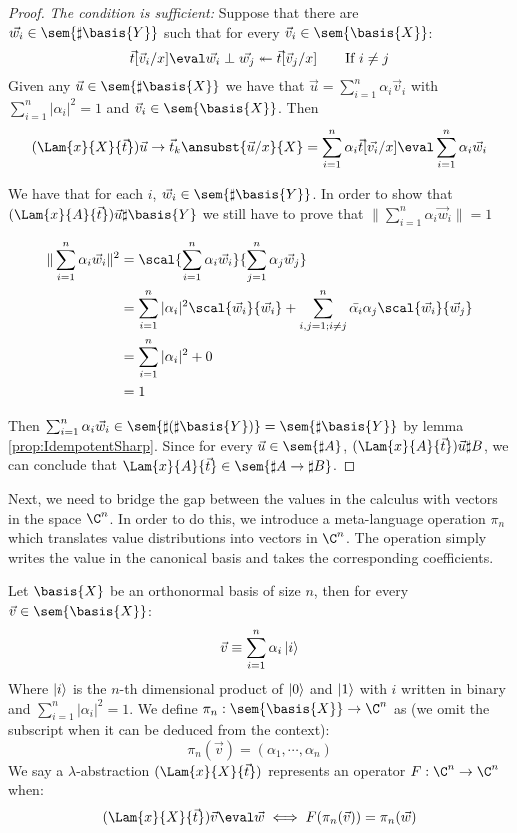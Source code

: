 \begin{proof}
  \textit{The condition is sufficient:} Suppose that there are $\vec{w_i}\in\sem{\sharp\basis{Y}}$ such that for every $\vec v_i\in\sem{\basis{X}}$:
  \[
    \vec t[\vec v_i/x] \eval \vec{w_i} \perp \vec{w_j} \twoheadleftarrow \vec t[\vec v_j/x]\qquad \text{If } i\neq j
  \]
  Given any $\vec u\in\sem{\sharp\basis{X}}$ we have that $\vec u = \sum_{i=1}^n \alpha_i \vec v_i$ with $\sum_{i=1}^n |\alpha_i|^2 = 1$ and $\vec v_i\in\sem{\basis{X}}$. Then 
  \[
    (\Lam{x}{X}{\vec t}) \vec u \to \vec t_k\ansubst{\vec u/x}{X}=\sum_{i=1}^{n}\alpha_i \vec{t}[\vec{v_i}/x]\eval\sum_{i=1}^n \alpha_i\vec w_i
  \]

  We have that for each $i$, $\vec w_i\in\sem{\sharp\basis{Y}}$. In order to show that $(\Lam{x}{A}{\vec t})\vec u\real\sharp\basis{Y}$ we still have to prove that $\|\sum_{i=1}^n \alpha_i \vec w_i\| = 1$

  \begin{align*}
    \|\sum_{i=1}^n \alpha_i \vec w_i\|^2 &= \scal{\sum_{i=1}^n \alpha_i \vec w_i}{\sum_{j=1}^n \alpha_j \vec w_j}\\
    &=\sum_{i=1}^n |\alpha_i|^2 \scal{\vec w_i}{\vec w_i } + \sum_{i,j=1; i\neq j}^n \bar{\alpha_i}\alpha_j \scal{\vec w_i}{\vec w_j}\\
    &=\sum_{i=1}^n |\alpha_i|^2 + 0\\
    &= 1
  \end{align*}

  Then $\sum_{i=1}^n \alpha_i \vec w_i\in\sem{\sharp(\sharp\basis{Y})}=\sem{\sharp\basis{Y}}$ by lemma \ref{prop:IdempotentSharp}. Since for every $\vec u\in\sem{\sharp A}$, $(\Lam{x}{A}{\vec t}) \vec u\real\sharp B$, we can conclude that $\Lam{x}{A}{\vec t}\in\sem{\sharp A\to\sharp B}$.
\end{proof}

Next, we need to bridge the gap between the values in the calculus with vectors in the space $\C^n$. In order to do this, we introduce a meta-language operation $\pi_n$ which translates value distributions into vectors in $\C^n$. The operation simply writes the value in the canonical basis and takes the corresponding coefficients. 

\begin{definition}  
Let $\basis{X}$ be an orthonormal basis of size $n$, then for every $\vec{v}\in\sem{\basis{X}}$:
\[
\vec{v}\equiv \sum_{i=1}^{n}\alpha_i\left\vert{i}\right\rangle
\]
Where $\left\vert{i}\right\rangle$ is the $n$-th dimensional product of $\left\vert{0}\right\rangle$ and $\left\vert{1}\right\rangle$ with $i$ written in binary and $\sum_{i=1}^{n}|\alpha_i|^2=1$. We define $\pi_n:\sem{\basis{X}}\to\C^n$ as (we omit the subscript when it can be deduced from the context):
\[
\pi_n(\vec{v}) = (\alpha_1,\dotsb ,\alpha_n)
\]
We say a $\lambda$-abstraction $(\Lam{x}{X}{\vec{t}})$ represents an operator $F:\C^n\to\C^n$ when:
\[
(\Lam{x}{X}{\vec{t}})\vec{v} \eval \vec{w} \iff F(\pi_n(\vec{v})) = \pi_n(\vec{w})
\]
\end{definition}

